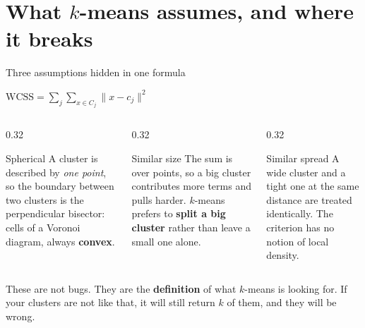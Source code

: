 \documentclass[aspectratio=169]{beamer}
\begin{document}
\section[Assumptions]{What $k$-means assumes, and where it breaks}
\label{sec:assume}

\begin{frame}[shrink=8]{Three assumptions hidden in one formula}
  \begin{exampleblock}{}
    \centering\large
    $\mathrm{WCSS} = \sum_j \sum_{x \in C_j} \lVert x - c_j\rVert^2$
  \end{exampleblock}
  \begin{columns}[T]
    \begin{column}{0.32\textwidth}
      \begin{block}{Spherical}
        \small A cluster is described by \emph{one point}, so the boundary
        between two clusters is the perpendicular bisector: cells of a
        Voronoi diagram, always \textbf{convex}.
      \end{block}
    \end{column}
    \begin{column}{0.32\textwidth}
      \begin{block}{Similar size}
        \small The sum is over points, so a big cluster contributes more
        terms and pulls harder. $k$-means prefers to \textbf{split a big
        cluster} rather than leave a small one alone.
      \end{block}
    \end{column}
    \begin{column}{0.32\textwidth}
      \begin{block}{Similar spread}
        \small A wide cluster and a tight one at the same distance are
        treated identically. The criterion has no notion of local density.
      \end{block}
    \end{column}
  \end{columns}
  \vspace{0.3em}
  \begin{alertblock}{}
    \centering
    These are not bugs. They are the \textbf{definition} of what $k$-means is
    looking for. If your clusters are not like that, it will still return
    $k$ of them, and they will be wrong.
  \end{alertblock}
\end{frame}
\end{document}
